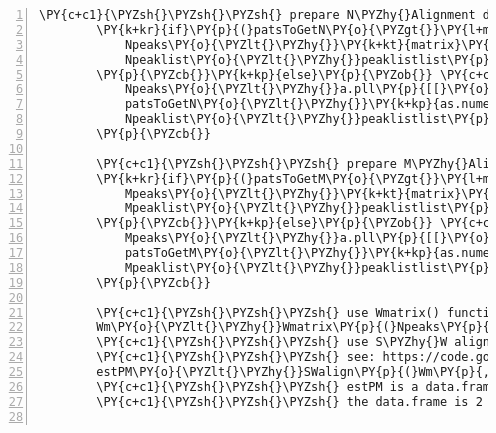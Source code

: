 \begin{Verbatim}[commandchars=\\\{\},codes={\catcode`\$=3\catcode`\^=7\catcode`\_=8},gobble=0,numbers=left,fontfamily=fvm,fontshape=n,fontsize=\footnotesize,tabsize=2]
		\PY{c+c1}{\PYZsh{}\PYZsh{}\PYZsh{} prepare N\PYZhy{}Alignment data}
		\PY{k+kr}{if}\PY{p}{(}patsToGetN\PY{o}{\PYZgt{}}\PY{l+m}{0}\PY{p}{)}\PY{p}{\PYZob{}} \PY{c+c1}{\PYZsh{} if a single spectrum (1\PYZhy{}alignment)}
			Npeaks\PY{o}{\PYZlt{}\PYZhy{}}\PY{k+kt}{matrix}\PY{p}{(}\PY{l+m}{1}\PY{o}{:}\PY{k+kp}{ncol}\PY{p}{(}peaklistlist\PY{p}{[[}patsToGetN\PY{p}{]]}\PY{p}{)}\PY{p}{,}ncol\PY{o}{=}\PY{l+m}{1}\PY{p}{)}
			Npeaklist\PY{o}{\PYZlt{}\PYZhy{}}peaklistlist\PY{p}{[}patsToGetN\PY{p}{]}
		\PY{p}{\PYZcb{}}\PY{k+kp}{else}\PY{p}{\PYZob{}} \PY{c+c1}{\PYZsh{} if a previously aligned N\PYZhy{}alignment (N\PYZgt{}1)}
			Npeaks\PY{o}{\PYZlt{}\PYZhy{}}a.pll\PY{p}{[[}\PY{o}{\PYZhy{}}patsToGetN\PY{p}{]]}
			patsToGetN\PY{o}{\PYZlt{}\PYZhy{}}\PY{k+kp}{as.numeric}\PY{p}{(}\PY{k+kp}{colnames}\PY{p}{(}Npeaks\PY{p}{)}\PY{p}{)}
			Npeaklist\PY{o}{\PYZlt{}\PYZhy{}}peaklistlist\PY{p}{[}patsToGetN\PY{p}{]}
		\PY{p}{\PYZcb{}}

		\PY{c+c1}{\PYZsh{}\PYZsh{}\PYZsh{} prepare M\PYZhy{}Alignment data}
		\PY{k+kr}{if}\PY{p}{(}patsToGetM\PY{o}{\PYZgt{}}\PY{l+m}{0}\PY{p}{)}\PY{p}{\PYZob{}} \PY{c+c1}{\PYZsh{} if a single spectrum (1\PYZhy{}alignment)}
			Mpeaks\PY{o}{\PYZlt{}\PYZhy{}}\PY{k+kt}{matrix}\PY{p}{(}\PY{l+m}{1}\PY{o}{:}\PY{k+kp}{ncol}\PY{p}{(}peaklistlist\PY{p}{[[}patsToGetM\PY{p}{]]}\PY{p}{)}\PY{p}{,}ncol\PY{o}{=}\PY{l+m}{1}\PY{p}{)}
			Mpeaklist\PY{o}{\PYZlt{}\PYZhy{}}peaklistlist\PY{p}{[}patsToGetM\PY{p}{]}
		\PY{p}{\PYZcb{}}\PY{k+kp}{else}\PY{p}{\PYZob{}} \PY{c+c1}{\PYZsh{} if a previously aligned M\PYZhy{}alignment (M\PYZgt{}1)}
			Mpeaks\PY{o}{\PYZlt{}\PYZhy{}}a.pll\PY{p}{[[}\PY{o}{\PYZhy{}}patsToGetM\PY{p}{]]}
			patsToGetM\PY{o}{\PYZlt{}\PYZhy{}}\PY{k+kp}{as.numeric}\PY{p}{(}\PY{k+kp}{colnames}\PY{p}{(}Mpeaks\PY{p}{)}\PY{p}{)}
			Mpeaklist\PY{o}{\PYZlt{}\PYZhy{}}peaklistlist\PY{p}{[}patsToGetM\PY{p}{]}
		\PY{p}{\PYZcb{}}
		
		\PY{c+c1}{\PYZsh{}\PYZsh{}\PYZsh{} use Wmatrix() function}
		Wm\PY{o}{\PYZlt{}\PYZhy{}}Wmatrix\PY{p}{(}Npeaks\PY{p}{,}Npeaklist\PY{p}{,}Mpeaks\PY{p}{,}Mpeaklist\PY{p}{,}D\PY{p}{,}expon\PY{p}{,}lambda\PY{p}{)}
		\PY{c+c1}{\PYZsh{}\PYZsh{}\PYZsh{} use S\PYZhy{}W alignment function to estimate maximum path}
		\PY{c+c1}{\PYZsh{}\PYZsh{}\PYZsh{} see: https://code.google.com/p/swalign/}
		estPM\PY{o}{\PYZlt{}\PYZhy{}}SWalign\PY{p}{(}Wm\PY{p}{,}G\PY{p}{,}maxM\PY{p}{)} 
		\PY{c+c1}{\PYZsh{}\PYZsh{}\PYZsh{} estPM is a data.frame of (i,j) locations of the maximum path}
		\PY{c+c1}{\PYZsh{}\PYZsh{}\PYZsh{} the data.frame is 2 columns for i,j points}
		

\end{Verbatim}
